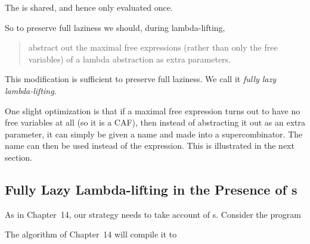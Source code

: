 \noindent
The  is shared, and hence only evaluated once.

So to preserve full laziness we should, during lambda-lifting,
\begin{quote}
    abstract out the maximal free expressions (rather than only the free
    variables) of a lambda abstraction as extra parameters.
\end{quote}
This modification is sufficient to preserve full laziness. We call it \textit{fully lazy
    lambda-lifting}.

One slight optimization is that if a maximal free expression turns out to
have no free variables at all (so it is a CAF), then instead of abstracting it out
as an extra parameter, it can simply be given a name and made into a
supercombinator. The name can then be used instead of the expression. This
is illustrated in the next section.

\subsection{Fully Lazy Lambda-lifting in the Presence of s}

As in Chapter~14, our strategy needs to take account of s. Consider the
program


The algorithm of Chapter~14 will compile it to


